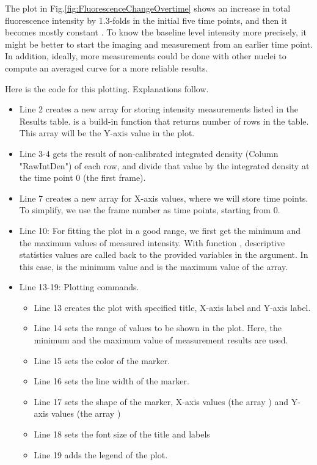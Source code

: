 The plot in Fig.\ref{fig:FluorescenceChangeOvertime} shows an increase in total fluorescence intensity by 1.3-folds in the initial five time points, and then it becomes mostly constant . To know the baseline level intensity more precisely, it might be better to start the imaging and measurement from an earlier time point. In addition, ideally, more measurements could be done with other nuclei to compute an averaged curve for a more reliable results. 

Here is the code for this plotting. Explanations follow. 

 
 
 \begin{itemize}
     \item Line 2 creates a new array for storing intensity measurements listed in the Results table.  is a build-in function that returns number of rows in the table. This array will be the Y-axis value in the plot. 
     \item Line 3-4 gets the result of non-calibrated integrated density (Column "RawIntDen") of each row, and divide that value by the integrated density at the time point 0 (the first frame). 
     \item Line 7 creates a new array for X-axis values, where we will store time points. To simplify, we use the frame number as time points, starting from 0. 
     \item Line 10: For fitting the plot in a good range, we first get the minimum and the maximum values of measured intensity. With function , descriptive statistics values are called back to the provided variables in the argument. In this case,  is the minimum value and  is the maximum value of the array. 
     \item Line 13-19: Plotting commands.
     \begin{itemize}
         \item Line 13 creates the plot with specified title, X-axis label and Y-axis label. 
         \item Line 14 sets the range of values to be shown in the plot. Here, the minimum and the maximum value of measurement results are used.
         \item Line 15 sets the color of the marker.
         \item Line 16 sets the line width of the marker.
         \item Line 17 sets the shape of the marker, X-axis values (the array ) and Y-axis values (the array )
         \item Line 18 sets the font size of the title and labels
         \item Line 19 adds the legend of the plot.  
     \end{itemize}
 \end{itemize}


